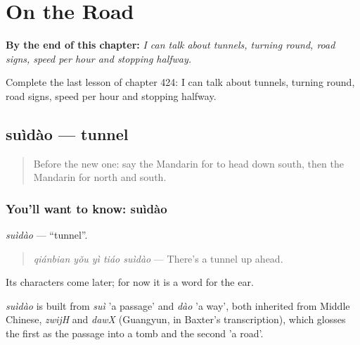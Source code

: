 
\chapter{On the Road}
\label{ch:zh-on-the-road}

\begin{chapteropening}
\textbf{By the end of this chapter:} \emph{I can talk about tunnels, turning round, road signs, speed per hour and stopping halfway.}

Complete the last lesson of chapter 424: I can talk about tunnels, turning round, road signs, speed per hour and stopping halfway.
\end{chapteropening}

\section[suìdào]{suìdào — tunnel}

\label{lesson:ZH-C424-suidao}



\begin{quote}
Before the new one: say the Mandarin for to head down south, then the Mandarin for north and south.
\end{quote}

\subsection*{You'll want to know: suìdào}
\emph{suìdào} — \textquotedblleft{}tunnel\textquotedblright{}.

\begin{quote}
\emph{qiánbian yǒu yì tiáo suìdào} — There's a tunnel up ahead.
\end{quote}

Its characters come later; for now it is a word for the ear.

\begin{cousinweb}
\emph{suìdào} is built from \emph{suì} 'a passage' and \emph{dào} 'a way', both inherited from Middle Chinese, \emph{zwijH} and \emph{dawX} (Guangyun, in Baxter's transcription), which glosses the first as the passage into a tomb and the second 'a road'.
\end{cousinweb}

